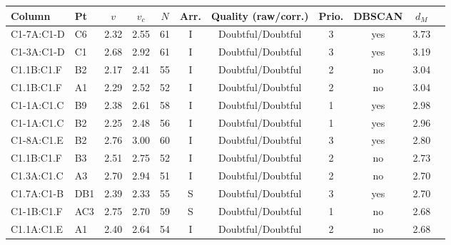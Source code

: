 \begin{tabular}{llccccccccc}
\toprule
Column & Pt & $v$ & $v_c$ & $N$ & Arr. & Quality (raw/corr.) & Prio. & DBSCAN & $d_M$ \\
\midrule
C1-7A:C1-D & C6 & 2.32 & 2.55 & 61 & I & Doubtful/Doubtful & 3 & yes & 3.73 \\
C1-3A:C1-D & C1 & 2.68 & 2.92 & 61 & I & Doubtful/Doubtful & 3 & yes & 3.19 \\
C1.1B:C1.F & B2 & 2.17 & 2.41 & 55 & I & Doubtful/Doubtful & 2 & no & 3.04 \\
C1.1B:C1.F & A1 & 2.29 & 2.52 & 52 & I & Doubtful/Doubtful & 2 & no & 3.04 \\
C1-1A:C1.C & B9 & 2.38 & 2.61 & 58 & I & Doubtful/Doubtful & 1 & yes & 2.98 \\
C1-1A:C1.C & B2 & 2.25 & 2.48 & 56 & I & Doubtful/Doubtful & 1 & yes & 2.96 \\
C1-8A:C1.E & B2 & 2.76 & 3.00 & 60 & I & Doubtful/Doubtful & 3 & yes & 2.80 \\
C1.1B:C1.F & B3 & 2.51 & 2.75 & 52 & I & Doubtful/Doubtful & 2 & no & 2.73 \\
C1.3A:C1.C & A3 & 2.70 & 2.94 & 51 & I & Doubtful/Doubtful & 2 & no & 2.70 \\
C1.7A:C1-B & DB1 & 2.39 & 2.33 & 55 & S & Doubtful/Doubtful & 3 & yes & 2.70 \\
C1-1B:C1.F & AC3 & 2.75 & 2.70 & 59 & S & Doubtful/Doubtful & 1 & no & 2.68 \\
C1.1A:C1.E & A1 & 2.40 & 2.64 & 54 & I & Doubtful/Doubtful & 2 & no & 2.68 \\
\bottomrule
\end{tabular}
